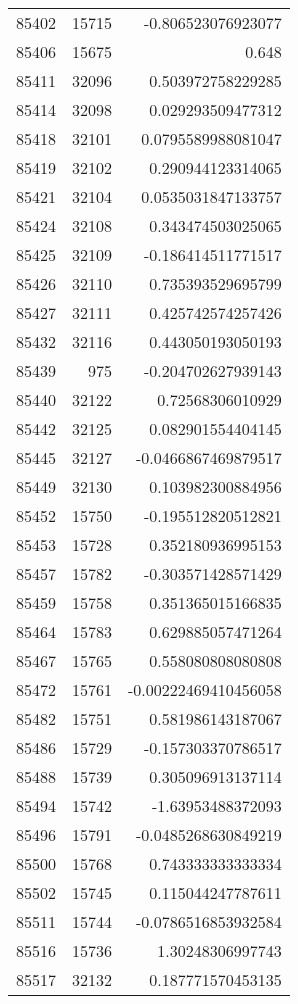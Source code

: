 \begin{tabular}{r | r | r}
85402 & 15715 & -0.806523076923077 \\
85406 & 15675 & 0.648 \\
85411 & 32096 & 0.503972758229285 \\
85414 & 32098 & 0.029293509477312 \\
85418 & 32101 & 0.0795589988081047 \\
85419 & 32102 & 0.290944123314065 \\
85421 & 32104 & 0.0535031847133757 \\
85424 & 32108 & 0.343474503025065 \\
85425 & 32109 & -0.186414511771517 \\
85426 & 32110 & 0.735393529695799 \\
85427 & 32111 & 0.425742574257426 \\
85432 & 32116 & 0.443050193050193 \\
85439 & 975 & -0.204702627939143 \\
85440 & 32122 & 0.72568306010929 \\
85442 & 32125 & 0.082901554404145 \\
85445 & 32127 & -0.0466867469879517 \\
85449 & 32130 & 0.103982300884956 \\
85452 & 15750 & -0.195512820512821 \\
85453 & 15728 & 0.352180936995153 \\
85457 & 15782 & -0.303571428571429 \\
85459 & 15758 & 0.351365015166835 \\
85464 & 15783 & 0.629885057471264 \\
85467 & 15765 & 0.558080808080808 \\
85472 & 15761 & -0.00222469410456058 \\
85482 & 15751 & 0.581986143187067 \\
85486 & 15729 & -0.157303370786517 \\
85488 & 15739 & 0.305096913137114 \\
85494 & 15742 & -1.63953488372093 \\
85496 & 15791 & -0.0485268630849219 \\
85500 & 15768 & 0.743333333333334 \\
85502 & 15745 & 0.115044247787611 \\
85511 & 15744 & -0.0786516853932584 \\
85516 & 15736 & 1.30248306997743 \\
85517 & 32132 & 0.187771570453135 \\

\end{tabular}
